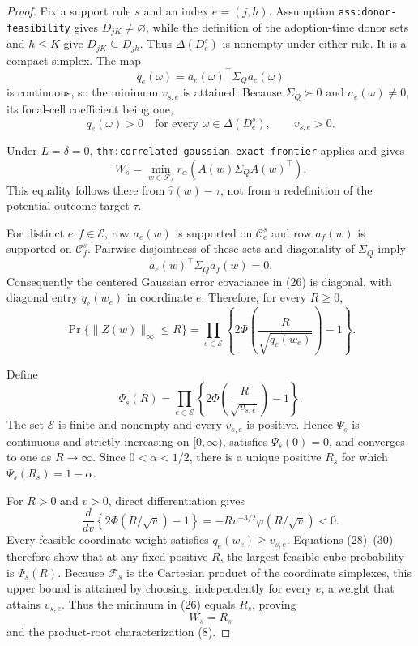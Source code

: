 \documentclass{article}
\begin{document}
\begin{proof}
Fix a support rule \(s\) and an index \(e=(j,h)\).  Assumption
\texttt{ass:donor-feasibility} gives \(D_{jK}\ne\varnothing\), while the
definition of the adoption-time donor sets and \(h\leq K\) give
\(D_{jK}\subseteq D_{jh}\).  Thus \(\Delta(D^s_e)\) is nonempty under
either rule.  It is a compact simplex.  The map
\[
 q_e(\omega)=a_e(\omega)^{\top}\Sigma_Qa_e(\omega) \tag{24}
\]
is continuous, so the minimum \(v_{s,e}\) is attained.  Because
\(\Sigma_Q\succ0\) and \(a_e(\omega)\ne0\), its focal-cell coefficient being
one,
\[
 q_e(\omega)>0\quad\text{for every }\omega\in\Delta(D^s_e),
 \qquad v_{s,e}>0. \tag{25}
\]

Under \(L=\delta=0\),
\texttt{thm:correlated-gaussian-exact-frontier} applies and gives
\[
 W_s=\min_{w\in\mathcal F_s}r_\alpha
 \!\left(A(w)\Sigma_QA(w)^{\top}\right). \tag{26}
\]
This equality follows there from
\(\widehat\tau(w)-\tau\), not from a redefinition of the potential-outcome
target \(\tau\).

For distinct \(e,f\in\mathcal E\), row \(a_e(w)\) is supported on
\(\mathcal C^s_e\) and row \(a_f(w)\) is supported on
\(\mathcal C^s_f\).  Pairwise disjointness of these sets and diagonality of
\(\Sigma_Q\) imply
\[
 a_e(w)^{\top}\Sigma_Qa_f(w)=0. \tag{27}
\]
Consequently the centered Gaussian error covariance in (26) is diagonal,
with diagonal entry \(q_e(w_e)\) in coordinate \(e\).  Therefore, for every
\(R\geq0\),
\[
 \Pr\{\lVert Z(w)\rVert_\infty\leq R\}
 =\prod_{e\in\mathcal E}
 \left\{2\Phi\!\left(\frac{R}{\sqrt{q_e(w_e)}}\right)-1\right\}. \tag{28}
\]

Define
\[
 \Psi_s(R)=\prod_{e\in\mathcal E}
 \left\{2\Phi\!\left(\frac{R}{\sqrt{v_{s,e}}}\right)-1\right\}.
 \tag{29}
\]
The set \(\mathcal E\) is finite and nonempty and every \(v_{s,e}\) is
positive.  Hence \(\Psi_s\) is continuous and strictly increasing on
\([0,\infty)\), satisfies \(\Psi_s(0)=0\), and converges to one as
\(R\to\infty\).  Since \(0<\alpha<1/2\), there is a unique positive
\(R_s\) for which \(\Psi_s(R_s)=1-\alpha\).

For \(R>0\) and \(v>0\), direct differentiation gives
\[
 \frac{d}{dv}\left\{2\Phi(R/\sqrt v)-1\right\}
 =-Rv^{-3/2}\varphi(R/\sqrt v)<0. \tag{30}
\]
Every feasible coordinate weight satisfies \(q_e(w_e)\geq v_{s,e}\).
Equations (28)--(30) therefore show that at any fixed positive \(R\), the
largest feasible cube probability is \(\Psi_s(R)\).  Because
\(\mathcal F_s\) is the Cartesian product of the coordinate simplexes, this
upper bound is attained by choosing, independently for every \(e\), a weight
that attains \(v_{s,e}\).  Thus the minimum in (26) equals \(R_s\), proving
\[
 W_s=R_s
\]
and the product-root characterization (8).


\end{proof}
\end{document}
